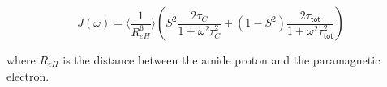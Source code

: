 \documentclass[9pt,review]{livecoms}
\begin{document}
\begin{equation}
\label{eqn:pre_spectral_density}
J(\omega) = \langle \frac {1} {R_{eH}^6} \rangle \left( S^2 \frac {2 \tau_C} {1 + \omega^2 \tau_C^2} + \left( 1 - S^2 \right) \frac {2 \tau_{\mathsf{tot}}} {1 + \omega^2 \tau_{\mathsf{tot}}^2} \right)
\end{equation}

where $R_{eH}$ is the distance between the amide proton and the paramagnetic electron.
\end{document}
